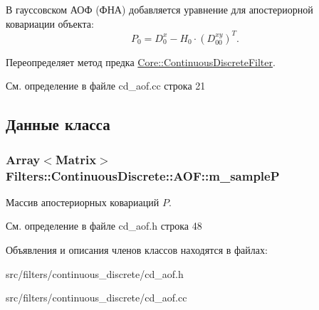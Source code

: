 В гауссовском АОФ (ФНА) добавляется уравнение для апостериорной ковариации объекта\+: \[P_0 = D_0^x - H_0 \cdot (D_{00}^{xy})^T.\] 

Переопределяет метод предка \hyperlink{class_core_1_1_continuous_discrete_filter_acc9b18241a13d46dc92ef1f02ec13e53}{Core\+::\+Continuous\+Discrete\+Filter}.



См. определение в файле cd\+\_\+aof.\+cc строка 21



\subsection{Данные класса}
\subsubsection[{\texorpdfstring{m\+\_\+sampleP}{m_sampleP}}]{\setlength{\rightskip}{0pt plus 5cm}Array$<$Matrix$>$ Filters\+::\+Continuous\+Discrete\+::\+A\+O\+F\+::m\+\_\+sampleP\hspace{0.3cm}{\ttfamily [protected]}}\hypertarget{class_filters_1_1_continuous_discrete_1_1_a_o_f_a31111852e94dab62675d8692a4c22df1}{}\label{class_filters_1_1_continuous_discrete_1_1_a_o_f_a31111852e94dab62675d8692a4c22df1}
Массив апостериорных ковариаций $P$. 

См. определение в файле cd\+\_\+aof.\+h строка 48



Объявления и описания членов классов находятся в файлах\+:\begin{DoxyCompactItemize}
\item 
src/filters/continuous\+\_\+discrete/cd\+\_\+aof.\+h\item 
src/filters/continuous\+\_\+discrete/cd\+\_\+aof.\+cc\end{DoxyCompactItemize}
